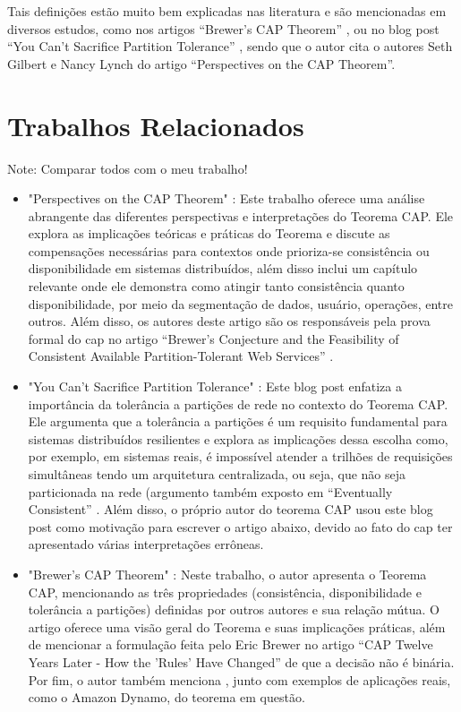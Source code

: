 Tais definições estão muito bem explicadas nas literatura e são mencionadas em diversos estudos, como nos artigos ``Brewer's CAP Theorem'' \cite{BrewerCAPTheoremSimonSalome}, ou no blog post ``You Can’t Sacrifice Partition Tolerance'' \cite{YouCantSacrificePartitionToleranceCodaHale2010}, sendo que o autor cita o autores Seth Gilbert e Nancy Lynch do artigo ``Perspectives on the CAP Theorem''.

\section{Trabalhos Relacionados}
Note: Comparar todos com o meu trabalho!

\begin{itemize}
    \item "Perspectives on the CAP Theorem" \cite{PerspectivesCAPTheoremGilbertLynch2012}: Este trabalho oferece uma análise abrangente das diferentes perspectivas e interpretações do Teorema CAP. Ele explora as implicações teóricas e práticas do Teorema e discute as compensações necessárias para contextos onde prioriza-se consistência ou disponibilidade em sistemas distribuídos, além disso inclui um capítulo relevante onde ele demonstra como atingir tanto consistência quanto disponibilidade, por meio da segmentação de dados, usuário, operações, entre outros. Além disso, os autores deste artigo são os responsáveis pela prova formal do \gls{cap} no artigo ``Brewer's Conjecture and the Feasibility of Consistent Available Partition-Tolerant Web Services'' \cite{Brewer'sConjectureAndTheFeasibilityOfConsistentAvailablePartition-TolerantWebServicesGilbertLynch2002}.
    \item "You Can't Sacrifice Partition Tolerance" \cite{YouCantSacrificePartitionToleranceCodaHale2010}: Este blog post enfatiza a importância da tolerância a partições de rede no contexto do Teorema CAP. Ele argumenta que a tolerância a partições é um requisito fundamental para sistemas distribuídos resilientes e explora as implicações dessa escolha como, por exemplo, em sistemas reais, é impossível atender a trilhões de requisições simultâneas tendo um arquitetura centralizada, ou seja, que não seja particionada na rede (argumento também exposto em ``Eventually Consistent'' \cite{EventuallyConsistentWernerVogels2009}. Além disso, o próprio autor do teorema CAP usou este blog post como motivação para escrever o artigo abaixo, devido ao fato do \gls{cap} ter apresentado várias interpretações errôneas.
    \item "Brewer's CAP Theorem" \cite{BrewerCAPTheoremSimonSalome}: Neste trabalho, o autor apresenta o Teorema CAP, mencionando as três propriedades (consistência, disponibilidade e tolerância a partições) definidas por outros autores e sua relação mútua. O artigo oferece uma visão geral do Teorema e suas implicações práticas, além de mencionar a formulação feita pelo Eric Brewer no artigo ``CAP Twelve Years Later - How the 'Rules' Have Changed'' de que a decisão não é binária. Por fim, o autor também menciona \cite{Brewer'sConjectureAndTheFeasibilityOfConsistentAvailablePartition-TolerantWebServicesGilbertLynch2002}, junto com exemplos de aplicações reais, como o Amazon Dynamo, do teorema em questão. 

\end{itemize}

